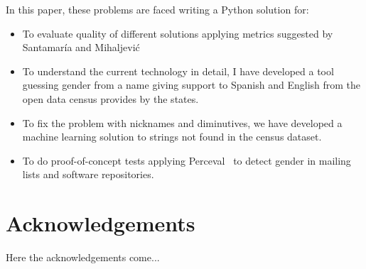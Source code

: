 \documentclass[a4paper]{article}
\begin{document}
In this paper, these problems are faced writing a Python solution for:

\begin{itemize}
\item To evaluate quality of different solutions applying metrics
  suggested by Santamaría and Mihaljević~\cite{10.7717/peerj-cs.156}
\item To understand the current technology in detail, I have developed
  a tool guessing gender from a name giving support to Spanish and
  English from the open data census provides by the states.
\item To fix the problem with nicknames and diminutives, we have
  developed a machine learning solution to strings not found in the
  census dataset.
\item To do proof-of-concept tests applying Perceval~\cite{duenas2018perceval} to detect
  gender in mailing lists and software repositories.
\end{itemize}

\section*{Acknowledgements}

Here the acknowledgements come...

 

\end{document}
